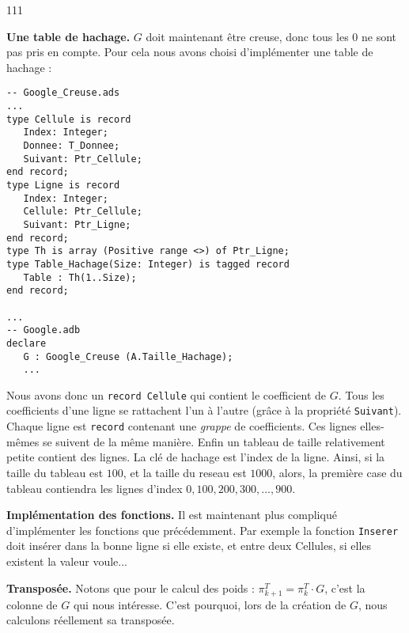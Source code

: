 \begin{dinglist}{111}
   \item \textbf{Une table de hachage.}
   $G$ doit maintenant être creuse, donc tous les $0$ ne sont pas pris en compte. Pour cela nous avons choisi d'implémenter une table de hachage :
   \begin{lstlisting}[caption=Type de \lstinline{Google_Creuse}]
-- Google_Creuse.ads
...
type Cellule is record 
   Index: Integer;
   Donnee: T_Donnee;
   Suivant: Ptr_Cellule;
end record;
type Ligne is record 
   Index: Integer;
   Cellule: Ptr_Cellule;
   Suivant: Ptr_Ligne;
end record;
type Th is array (Positive range <>) of Ptr_Ligne;
type Table_Hachage(Size: Integer) is tagged record
   Table : Th(1..Size);
end record;

...
-- Google.adb
declare
   G : Google_Creuse (A.Taille_Hachage);
   ...
      \end{lstlisting}
Nous avons donc un \lstinline{record Cellule} qui contient le coefficient de $G$. Tous les coefficients d'une ligne se rattachent l'un à l'autre (grâce à la propriété \lstinline{Suivant}).
Chaque ligne est  \lstinline{record} contenant une \textit{grappe} de coefficients. Ces lignes elles-mêmes se suivent de la même manière.
Enfin un tableau de taille relativement petite contient des lignes. La clé de hachage est l'index de la ligne. Ainsi, si la taille du tableau est $100$, et la taille du reseau est $1 000$, 
alors, la première case du tableau contiendra les lignes d'index $0, 100, 200, 300, ..., 900$.
   \item \textbf{Implémentation des fonctions.} Il est maintenant plus compliqué d'implémenter les fonctions que précédemment. Par exemple la fonction \lstinline{Inserer} doit insérer dans la bonne ligne si elle existe, et entre deux Cellules, si elles existent 
   la valeur voule...
   \item \textbf{Transposée.} Notons que pour le calcul des poids : $\pi^{T}_{k+1} = \pi^{T}_{k} \cdot G$, c'est la colonne de $G$ qui nous intéresse. C'est pourquoi, lors de la création de $G$,
   nous calculons réellement sa transposée.
\end{dinglist}